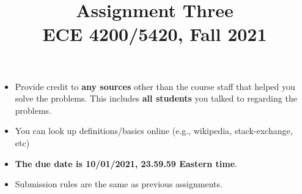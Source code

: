 \documentclass[11pt]{article}
\title{Assignment Three\\ ECE 4200/5420, Fall 2021}
\date{}
\begin{document}
\maketitle 

\begin{itemize}
\item
Provide credit to \textbf{any sources} other than the course staff that helped you solve the problems. This includes \textbf{all students} you talked to regarding the problems. 	
\item
You can look up definitions/basics online (e.g., wikipedia, stack-exchange, etc)
\item
{\bf The due date is 10/01/2021, 23.59.59 Eastern time}. 
\item
Submission rules are the same as previous assignments.
\end{itemize}
\end{document}
